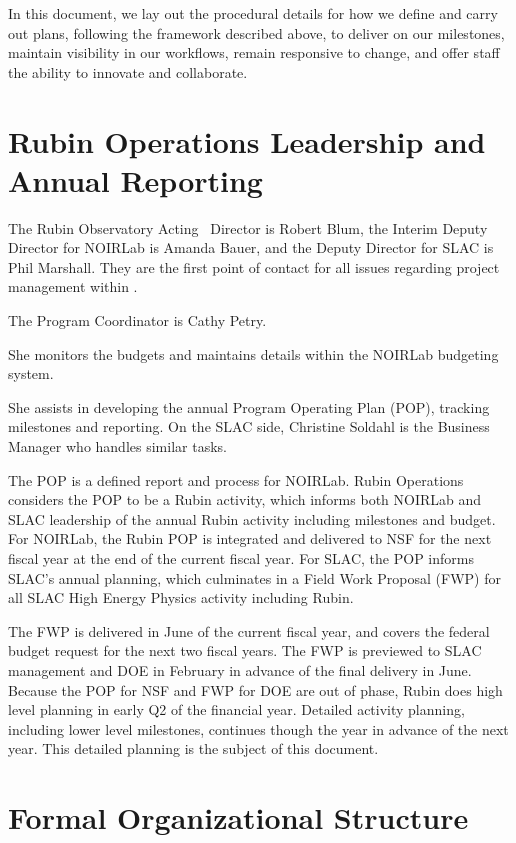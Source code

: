 In this document, we lay out the procedural details for how we define and carry out plans, following the framework described above, to deliver on our milestones, maintain visibility in our workflows, remain responsive to change, and offer staff the ability to innovate and collaborate.

\section{Rubin Operations Leadership and Annual Reporting}
\label{sec:contacts}

The Rubin Observatory Acting \ \gls{Director}  is Robert Blum, the Interim Deputy \gls{Director} for NOIRLab is Amanda Bauer, and the Deputy \gls{Director} for SLAC is Phil Marshall.
They are the first point of contact for all issues regarding project management within \RO.

The Program Coordinator is Cathy Petry.

She monitors the budgets and maintains details within the NOIRLab budgeting system. 

She assists in developing the annual Program Operating Plan (POP), tracking milestones and reporting. 
On the SLAC side, Christine Soldahl is the Business Manager who handles similar tasks. 

The POP is a defined report and process for NOIRLab. 
Rubin Operations considers the POP to be a Rubin activity, which informs both NOIRLab and SLAC leadership of the annual Rubin activity including milestones and budget. 
For NOIRLab, the Rubin POP is integrated and delivered to NSF for the next fiscal year at the end of the current fiscal year. 
For SLAC, the POP informs SLAC's annual planning, which culminates in a Field Work Proposal (FWP) for all SLAC High Energy Physics activity including Rubin. 

The FWP is delivered in June of the current fiscal year, and covers the federal budget request for the next two fiscal years. 
The FWP is previewed to SLAC management and DOE in February in advance of the final delivery in June. 
Because the POP for NSF and FWP for DOE are out of phase, Rubin does high level planning in early Q2 of the financial year. 
Detailed activity planning, including lower level milestones, continues though the year in advance of the next year. 
This detailed planning is the subject of this document.

\section{Formal Organizational Structure}
\label{sec:structure}

